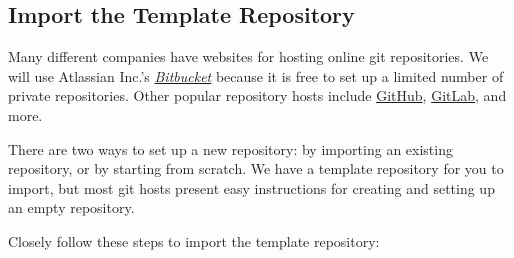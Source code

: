 \subsection*{Import the Template Repository} %

Many different companies have websites for hosting online git repositories.
We will use Atlassian Inc.'s \href{https://bitbucket.org/}{\emph{Bitbucket}} because it is free to set up a limited number of private repositories.
Other popular repository hosts include \href{https://github.com/}{GitHub}, \href{https://gitlab.com/}{GitLab}, and more.

There are two ways to set up a new repository: by importing an existing repository, or by starting from scratch.
We have a template repository for you to import, but most git hosts present easy instructions for creating and setting up an empty repository.

Closely follow these steps to import the template repository:

